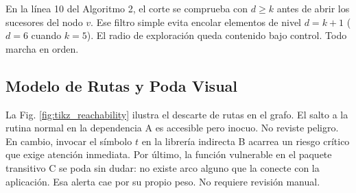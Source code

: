 \documentclass[conference]{IEEEtran}
\begin{document}
En la línea 10 del Algoritmo 2, el corte se comprueba con $d \ge k$ antes de abrir los sucesores del nodo $v$. Ese filtro simple evita encolar elementos de nivel $d=k+1$ ($d=6$ cuando $k=5$). El radio de exploración queda contenido bajo control. Todo marcha en orden.

\subsection{Modelo de Rutas y Poda Visual}
La Fig. \ref{fig:tikz_reachability} ilustra el descarte de rutas en el grafo. El salto a la rutina normal en la dependencia A es accesible pero inocuo. No reviste peligro. En cambio, invocar el símbolo $t$ en la librería indirecta B acarrea un riesgo crítico que exige atención inmediata. Por último, la función vulnerable en el paquete transitivo C se poda sin dudar: no existe arco alguno que la conecte con la aplicación. Esa alerta cae por su propio peso. No requiere revisión manual.
\end{document}
